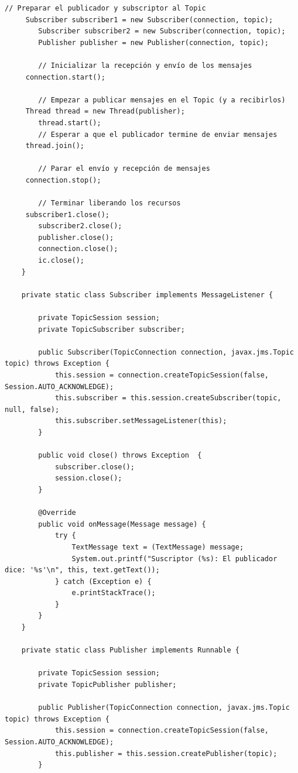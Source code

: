 \documentclass{article}
\begin{document}
\begin{lstlisting}[frame=single]
        // Preparar el publicador y subscriptor al Topic
     Subscriber subscriber1 = new Subscriber(connection, topic);
        Subscriber subscriber2 = new Subscriber(connection, topic);
        Publisher publisher = new Publisher(connection, topic);
        
        // Inicializar la recepción y envío de los mensajes
     connection.start();

        // Empezar a publicar mensajes en el Topic (y a recibirlos)
     Thread thread = new Thread(publisher);      
        thread.start();
        // Esperar a que el publicador termine de enviar mensajes
     thread.join();

        // Parar el envío y recepción de mensajes
     connection.stop();
        
        // Terminar liberando los recursos
     subscriber1.close();
        subscriber2.close();
        publisher.close();     
        connection.close();
        ic.close();
    }
    
    private static class Subscriber implements MessageListener {
        
        private TopicSession session;
        private TopicSubscriber subscriber;
        
        public Subscriber(TopicConnection connection, javax.jms.Topic topic) throws Exception {
            this.session = connection.createTopicSession(false, Session.AUTO_ACKNOWLEDGE);
            this.subscriber = this.session.createSubscriber(topic, null, false);
            this.subscriber.setMessageListener(this);
        }
        
        public void close() throws Exception  {
            subscriber.close();
            session.close();
        }
        
        @Override
        public void onMessage(Message message) {
            try {
                TextMessage text = (TextMessage) message;
                System.out.printf("Suscriptor (%s): El publicador dice: '%s'\n", this, text.getText());
            } catch (Exception e) {
                e.printStackTrace();
            }
        }
    }
    
    private static class Publisher implements Runnable {
        
        private TopicSession session;
        private TopicPublisher publisher;
        
        public Publisher(TopicConnection connection, javax.jms.Topic topic) throws Exception {
            this.session = connection.createTopicSession(false, Session.AUTO_ACKNOWLEDGE);
            this.publisher = this.session.createPublisher(topic);
        }
        

\end{lstlisting}
\end{document}
